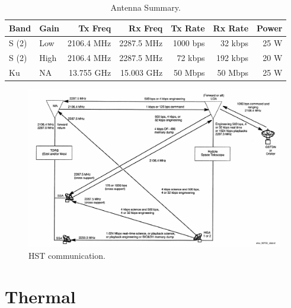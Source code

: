 \documentclass[paper=letter, fontsize=11pt]{scrartcl} %
\numberwithin{equation}{section} %
\numberwithin{figure}{section} %
\numberwithin{table}{section} %
\begin{document}
\begin{table}[H]
    \begin{center}
        \begin{tabular}{l l r r r r r}
            \toprule
            Band  & Gain & Tx Freq    & Rx Freq    & Tx Rate  & Rx Rate  & Power \\
            \midrule
            S (2) & Low  & 2106.4 MHz & 2287.5 MHz & 1000 bps & 32 kbps  & 25 W  \\
            S (2) & High & 2106.4 MHz & 2287.5 MHz & 72 kbps  & 192 kbps & 20 W  \\
            Ku    & NA   & 13.755 GHz & 15.003 GHz & 50 Mbps  & 50 Mbps  & 25 W  \\

            \bottomrule
        \end{tabular}
    \end{center}
    \caption{Antenna Summary.}
\end{table}

\begin{figure}[H]
    \begin{center}
        \includegraphics[width=1\textwidth]{figs/HSTcom.PNG}
        \caption{HST communication.}
    \end{center}
\end{figure}



\section{Thermal}
\end{document}
